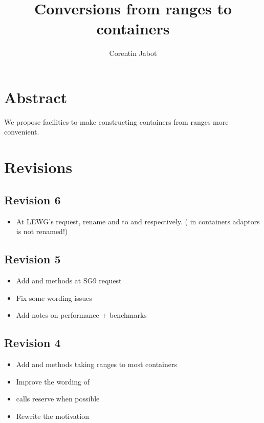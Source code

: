 \documentclass{wg21}
\title{Conversions from ranges to containers}
\author{Corentin Jabot}{corentin.jabot@gmail.com}
\begin{document}
\maketitle

\section{Abstract}

We propose facilities to make constructing containers from ranges more convenient.

\section{Revisions}

\subsection*{Revision 6}
\begin{itemize}
    \item At LEWG's request, rename  and  to  and  respectively.
    ( in containers adaptors is not renamed!)
\end{itemize}


\subsection*{Revision 5}
\begin{itemize}
    \item Add  and  methods at SG9 request
    \item Fix some wording issues
    \item Add notes on performance + benchmarks
\end{itemize}

\subsection*{Revision 4}
\begin{itemize}
    \item Add  and methods taking ranges to most containers
    \item Improve the wording of 
    \item {} calls reserve when possible
    \item Rewrite the motivation
\end{itemize}
\end{document}
